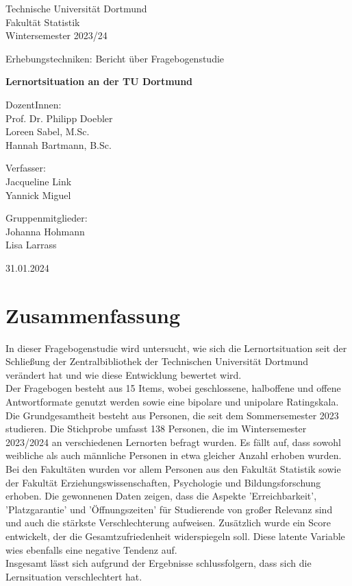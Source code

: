 \documentclass[11pt, a4paper]{article}
\begin{document}
\thispagestyle{empty}

\begin{center}
	\Large
	Technische Universität Dortmund\\
	Fakultät Statistik\\
	Wintersemester 2023/24\\
	
	\vspace{6em}
	
	Erhebungstechniken: Bericht über Fragebogenstudie
	
	\Huge
	\textbf{Lernortsituation an der TU Dortmund}
	
	\Large
	\vspace{4em}
	DozentInnen:	\\Prof. Dr. Philipp Doebler \\Loreen Sabel, M.Sc.\\Hannah Bartmann, B.Sc.


	\vspace{6em}
	Verfasser: \\
	Jacqueline Link \\ Yannick Miguel
	
	\vspace{6em}
	Gruppenmitglieder:\\
	Johanna Hohmann\\
	Lisa Larrass
	
    \vspace{6em}
    
	31.01.2024
\end{center}

\newpage \null\thispagestyle{empty}\newpage
\tableofcontents
\newpage\null\thispagestyle{empty}\newpage
\section*{Zusammenfassung}
In dieser Fragebogenstudie wird untersucht, wie sich die Lernortsituation seit der Schließung der Zentralbibliothek der Technischen Universität Dortmund verändert hat und wie diese Entwicklung bewertet wird.\\
Der Fragebogen besteht aus 15 Items, wobei geschlossene, halboffene und offene Antwortformate genutzt werden sowie eine bipolare und unipolare Ratingskala. \\
Die Grundgesamtheit besteht aus Personen, die seit dem Sommersemester 2023 studieren. Die Stichprobe umfasst 138 Personen, die im Wintersemester 2023/2024 an verschiedenen Lernorten befragt wurden.
Es fällt auf, dass sowohl weibliche als auch männliche Personen in etwa gleicher Anzahl erhoben wurden. Bei den Fakultäten wurden vor allem Personen aus den Fakultät Statistik sowie der Fakultät Erziehungswissenschaften, Psychologie und Bildungsforschung erhoben.
Die gewonnenen Daten zeigen, dass die Aspekte 'Erreichbarkeit',  'Platzgarantie' und 'Öffnungszeiten' für Studierende von großer Relevanz sind und auch die stärkste Verschlechterung aufweisen. Zusätzlich wurde ein Score entwickelt, der die Gesamtzufriedenheit widerspiegeln soll. Diese latente Variable wies ebenfalls eine negative Tendenz auf.\\
Insgesamt lässt sich aufgrund der Ergebnisse schlussfolgern, dass sich die Lernsituation verschlechtert hat.
\end{document}

